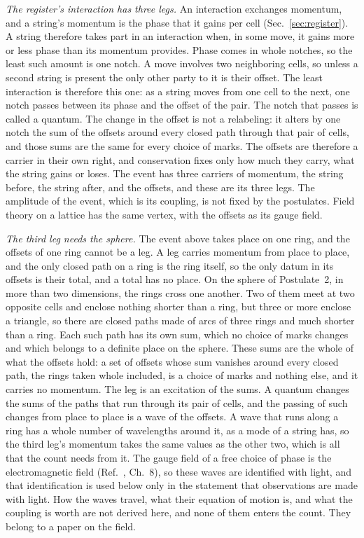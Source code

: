 \documentclass[aps,prd,twocolumn,superscriptaddress,nofootinbib]{revtex4-2}
\begin{document}
\textit{The register's interaction has three legs.} An interaction exchanges momentum, and a string's momentum is the phase that it gains per cell (Sec.~\ref{sec:register}). A string therefore takes part in an interaction when, in some move, it gains more or less phase than its momentum provides. Phase comes in whole notches, so the least such amount is one notch. A move involves two neighboring cells, so unless a second string is present the only other party to it is their offset. The least interaction is therefore this one: as a string moves from one cell to the next, one notch passes between its phase and the offset of the pair. The notch that passes is called a quantum. The change in the offset is not a relabeling: it alters by one notch the sum of the offsets around every closed path through that pair of cells, and those sums are the same for every choice of marks. The offsets are therefore a carrier in their own right, and conservation fixes only how much they carry, what the string gains or loses. The event has three carriers of momentum, the string before, the string after, and the offsets, and these are its three legs. The amplitude of the event, which is its coupling, is not fixed by the postulates. Field theory on a lattice has the same vertex, with the offsets as its gauge field.

\textit{The third leg needs the sphere.} The event above takes place on one ring, and the offsets of one ring cannot be a leg. A leg carries momentum from place to place, and the only closed path on a ring is the ring itself, so the only datum in its offsets is their total, and a total has no place. On the sphere of Postulate~2, in more than two dimensions, the rings cross one another. Two of them meet at two opposite cells and enclose nothing shorter than a ring, but three or more enclose a triangle, so there are closed paths made of arcs of three rings and much shorter than a ring. Each such path has its own sum, which no choice of marks changes and which belongs to a definite place on the sphere. These sums are the whole of what the offsets hold: a set of offsets whose sum vanishes around every closed path, the rings taken whole included, is a choice of marks and nothing else, and it carries no momentum. The leg is an excitation of the sums. A quantum changes the sums of the paths that run through its pair of cells, and the passing of such changes from place to place is a wave of the offsets. A wave that runs along a ring has a whole number of wavelengths around it, as a mode of a string has, so the third leg's momentum takes the same values as the other two, which is all that the count needs from it. The gauge field of a free choice of phase is the electromagnetic field (Ref.~\cite{weinberg1995}, Ch.~8), so these waves are identified with light, and that identification is used below only in the statement that observations are made with light. How the waves travel, what their equation of motion is, and what the coupling is worth are not derived here, and none of them enters the count. They belong to a paper on the field.
\end{document}
